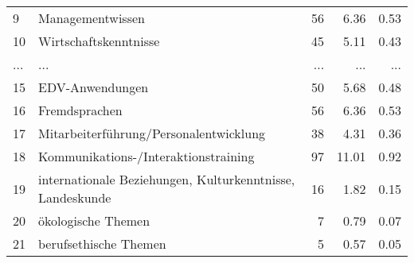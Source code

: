 \begin{longtable}{lXrrr}
        9 & \multicolumn{1}{X}{Managementwissen} & %
          \num{56} &
          \num[round-mode=places,round-precision=2]{6.36} &
          \num[round-mode=places,round-precision=2]{0.53} \\
        10 & \multicolumn{1}{X}{Wirtschaftskenntnisse} & %
          \num{45} &
          \num[round-mode=places,round-precision=2]{5.11} &
          \num[round-mode=places,round-precision=2]{0.43} \\
       ... & ... & ... & ... & ... \\
        15 & \multicolumn{1}{X}{EDV-Anwendungen} & %
          \num{50} &
          \num[round-mode=places,round-precision=2]{5.68} &
          \num[round-mode=places,round-precision=2]{0.48} \\

        16 & \multicolumn{1}{X}{Fremdsprachen} & %
          \num{56} &
          \num[round-mode=places,round-precision=2]{6.36} &
          \num[round-mode=places,round-precision=2]{0.53} \\

        17 & \multicolumn{1}{X}{Mitarbeiterführung/Personalentwicklung} & %
          \num{38} &
          \num[round-mode=places,round-precision=2]{4.31} &
          \num[round-mode=places,round-precision=2]{0.36} \\

        18 & \multicolumn{1}{X}{Kommunikations-/Interaktionstraining} & %
          \num{97} &
          \num[round-mode=places,round-precision=2]{11.01} &
          \num[round-mode=places,round-precision=2]{0.92} \\

        19 & \multicolumn{1}{X}{internationale Beziehungen, Kulturkenntnisse, Landeskunde} & %
          \num{16} &
          \num[round-mode=places,round-precision=2]{1.82} &
          \num[round-mode=places,round-precision=2]{0.15} \\

        20 & \multicolumn{1}{X}{ökologische Themen} & %
          \num{7} &
          \num[round-mode=places,round-precision=2]{0.79} &
          \num[round-mode=places,round-precision=2]{0.07} \\

        21 & \multicolumn{1}{X}{berufsethische Themen} & %
          \num{5} &
          \num[round-mode=places,round-precision=2]{0.57} &
          \num[round-mode=places,round-precision=2]{0.05} \\


\end{longtable}
